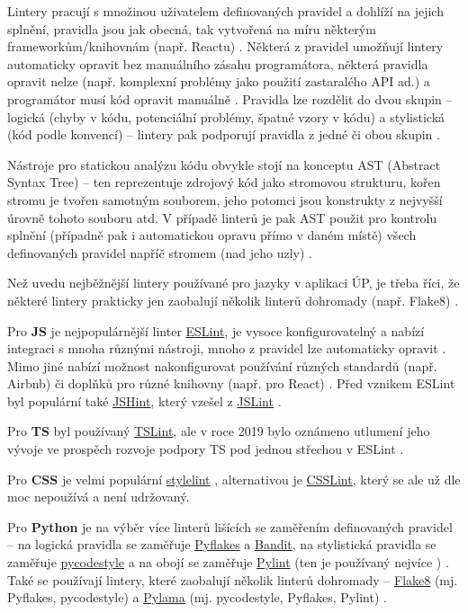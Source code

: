 Lintery pracují s množinou uživatelem definovaných pravidel a dohlíží na jejich splnění, pravidla jsou jak obecná, tak vytvořená na míru některým frameworkům/knihovnám (např. Reactu) \cite{linter-medium1}. Některá z pravidel umožňují lintery automaticky opravit bez manuálního zásahu programátora, některá pravidla opravit nelze (např. komplexní problémy jako použití zastaralého API ad.) a programátor musí kód opravit manuálně \cite{linter-medium1}. Pravidla lze rozdělit do dvou skupin -- logická (chyby v kódu, potenciální problémy, špatné vzory v kódu) a stylistická (kód podle konvencí) -- lintery pak podporují pravidla z jedné či obou skupin \cite{linter-realpython}.

Nástroje pro statickou analýzu kódu obvykle stojí na konceptu AST (Abstract Syntax Tree) -- ten reprezentuje zdrojový kód jako stromovou strukturu, kořen stromu je tvořen samotným souborem, jeho potomci jsou konstrukty z nejvyšší úrovně tohoto souboru atd. V případě linterů je pak AST použit pro kontrolu splnění (případně pak i automatickou opravu přímo v daném místě) všech definovaných pravidel napříč stromem (nad jeho uzly) \cite{linter-medium1, linter-medium2}.

Než uvedu nejběžnější lintery používané pro jazyky v aplikaci ÚP, je třeba říci, že některé lintery prakticky jen zaobalují několik linterů dohromady (např. Flake8) \cite{linter-realpython}.

Pro \textbf{JS} je nejpopulárnější linter \href{https://eslint.org/}{ESLint}, je vysoce konfigurovatelný a nabízí integraci s mnoha různými nástroji, mnoho z pravidel lze automaticky opravit \cite{linter-medium1}. Mimo jiné nabízí možnost nakonfigurovat používání různých standardů (např. Airbnb) \cite{linter-restishistory} či doplňků pro různé knihovny (např. pro React) \cite{react-eslint}. Před vznikem ESLint byl populární také \href{https://jshint.com/}{JSHint}, který vzešel z \href{https://jslint.com/}{JSLint} \cite{linter-restishistory}.

Pro \textbf{TS} byl používaný \href{https://palantir.github.io/tslint/}{TSLint}, ale v roce 2019 bylo oznámeno utlumení jeho vývoje ve prospěch rozvoje podpory TS pod jednou střechou v ESLint \cite{linter-eslintts}.

Pro \textbf{CSS} je velmi populární \href{https://stylelint.io/}{stylelint} \cite{stylelint, linter-css}, alternativou je \href{http://csslint.net/}{CSSLint}, který se ale už dle \cite{linter-css} moc nepoužívá a není udržovaný.

Pro \textbf{Python} je na výběr více linterů lišících se zaměřením definovaných pravidel -- na logická pravidla se zaměřuje \href{https://github.com/PyCQA/pyflakes}{Pyflakes} a \href{https://github.com/PyCQA/bandit}{Bandit}, na stylistická pravidla se zaměřuje \href{https://github.com/PyCQA/pycodestyle}{pycodestyle} a na obojí se zaměřuje \href{https://www.pylint.org/}{Pylint} (ten je používaný nejvíce \cite{linter-python}) \cite{linter-realpython}. Také se používají lintery, které zaobalují několik linterů dohromady -- \href{https://flake8.pycqa.org/en/latest/}{Flake8} (mj. Pyflakes, pycodestyle) a \href{https://github.com/klen/pylama}{Pylama} (mj. pycodestyle, Pyflakes, Pylint) \cite{linter-realpython}.


